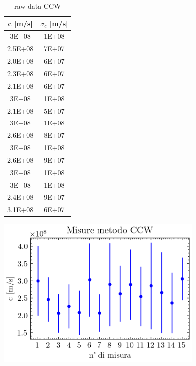 \documentclass{article}
\begin{document}
            \begin{table}[H]

                \begin{minipage}{0.35\linewidth}

                    \centering
                    \begin{tabular}{ c c } 

                        \toprule
                        c [m/s] &  $\sigma_c$ [m/s] \\ 

                        \midrule
                        3E+08	&    1E+08 \\
                        2.5E+08	&    7E+07 \\
                        2.0E+08	&    6E+07 \\
                        2.3E+08	&    6E+07 \\
                        2.1E+08	&    6E+07 \\
                        3E+08	&    1E+08 \\
                        2.1E+08	&    5E+07 \\
                        3E+08	&    1E+08 \\
                        2.6E+08	&    8E+07 \\
                        3E+08	&    1E+08 \\
                        2.6E+08	&    9E+07 \\
                        3E+08	&    1E+08 \\
                        3E+08	&    1E+08 \\
                        2.4E+08	&    9E+07 \\
                        3.1E+08	&    6E+07 \\
                        \bottomrule 

                    \end{tabular}
                    \caption{raw data CCW}
    
                \end{minipage}
                \begin{minipage}{0.65\linewidth}

                    \centering
                    \includegraphics[width=10cm]{../images/CCW.png}
                    \label{fig:c_CCW}


\end{minipage}
\end{table}
\end{document}

